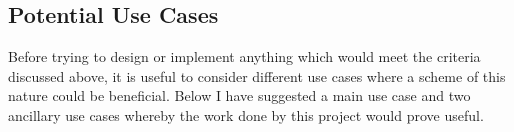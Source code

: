 \subsection{Potential Use Cases}

Before trying to design or implement anything which would meet the criteria discussed above, it is useful to consider different use cases where a scheme of this nature could be beneficial. Below I have suggested a main use case and two ancillary use cases whereby the work done by this project would prove useful.







